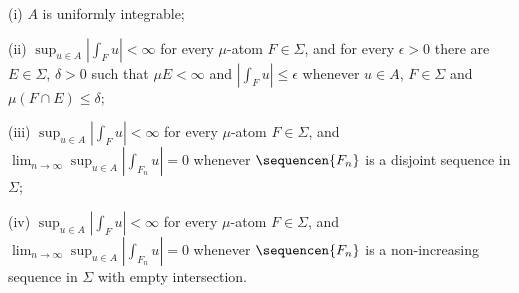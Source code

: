\quad(i) $A$ is uniformly integrable;

\quad(ii) $\sup_{u\in A}|\int_Fu|<\infty$ for every $\mu$-atom
$F\in\Sigma$, and for every $\epsilon>0$ there
are $E\in\Sigma$, $\delta>0$ such that $\mu E<\infty$ and
$|\int_Fu|\le\epsilon$ whenever $u\in A$, $F\in\Sigma$ and
$\mu(F\cap E)\le\delta$;

\quad(iii) $\sup_{u\in A}|\int_Fu|<\infty$ for every $\mu$-atom
$F\in\Sigma$, and $\lim_{n\to\infty}\sup_{u\in A}|\int_{F_n}u|=0$
whenever $\sequencen{F_n}$ is a disjoint sequence in $\Sigma$;

\quad(iv) $\sup_{u\in A}|\int_Fu|<\infty$ for every $\mu$-atom
$F\in\Sigma$, and $\lim_{n\to\infty}\sup_{u\in A}|\int_{F_n}u|=0$
whenever $\sequencen{F_n}$ is a non-increasing sequence in $\Sigma$ with
empty intersection.


